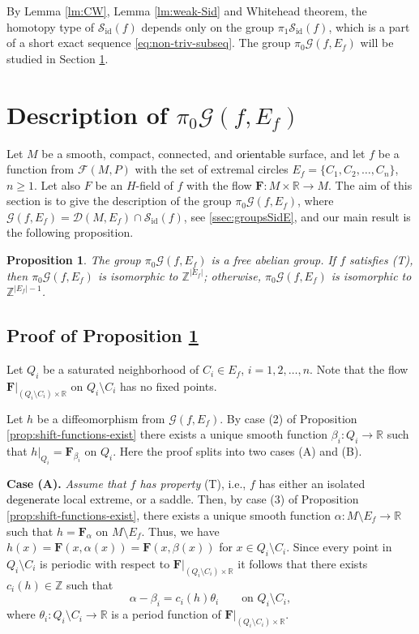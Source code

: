 \documentclass[10pt,reqno]{amsart}
\newtheorem{proposition}[subsection]{Proposition}
\newcommand{\bbR}{\mathbb{R}}
\newcommand{\bbZ}{\mathbb{Z}}
\newcommand{\bfF}{\mathbf{F}}
\newcommand{\Sid}{\mathcal{S}_{\id}(f)}
\newcommand{\F}{\mathcal{F}(M,P)}
\newcommand{\id}{\mathrm{id}}
\newcommand{\textr}[1]{\textcolor{black}{#1}}
\begin{document}
By Lemma \ref{lm:CW}, Lemma \ref{lm:weak-Sid} and Whitehead theorem, the homotopy type of $\mathcal{S}_{\id}(f)$ depends only on the group  $\pi_1\mathcal{S}_{\id}(f)$, which is a part of  a short exact sequence \eqref{eq:non-triv-subseq}. The group $\pi_0\mathcal{G}(f, E_f)$ will be studied in Section \ref{sec:pi0G}.



\section{Description of $\pi_0\mathcal{G}(f,E_f)$}\label{sec:pi0G}
Let $M$ be a smooth, compact, connected, and \textr{orientable} surface, and let $f$ be a function from $\F$ with the set of extremal circles $E_f = \{C_1,C_2,\ldots, C_n\}$, $n\geq 1$. Let also $F$ be an $H$-field of $f$ with the flow $\bfF:M\times\bbR\to M$. The aim of this section is to give the description of the group $\pi_0\mathcal{G}(f, E_f)$, where $\mathcal{G}(f,E_f) = \mathcal{D}(M, E_f)\cap \Sid$, see \textsection\ref{ssec:groupsSidE}, and
our main result   is the following proposition.
\begin{proposition}\label{prop:pi0-G}
	The group $\pi_0\mathcal{G}(f, E_f)$ is a free abelian group. If
	$f$ satisfies {\rm (T)},  then $\pi_0\mathcal{G}(f, E_f)$ is isomorphic to $\bbZ^{|E_f|}$; otherwise, $\pi_0\mathcal{G}(f, E_f)$ is isomorphic to $\bbZ^{|E_f|-1}$.
\end{proposition}




\subsection{Proof of Proposition \ref{prop:pi0-G}}
 Let $Q_i$ be a saturated neighborhood of $C_i\in E_f$, $i = 1,2,\ldots, n$.  Note that the flow $\bfF|_{(Q_i\setminus C_i)\times\bbR}$ on $Q_i\setminus C_i$ has no fixed points.



Let $h$ be a diffeomorphism from $\mathcal{G}(f, E_f).$ 
By case (2) of Proposition \ref{prop:shift-functions-exist} there exists a unique smooth function $\beta_i:Q_i\to \bbR$ such that $h|_{Q_i} = \bfF_{\beta_i}$ on $Q_i$. 
Here the proof splits into two cases (A) and (B).

{\bf Case (A).} {\it Assume that $f$ has property} (T), i.e., $f$ has  either an isolated \textr{degenerate} local extreme, or a saddle. Then,  by case (3) of  Proposition \ref{prop:shift-functions-exist},  there exists a unique smooth function $\alpha:M\setminus E_f\to \bbR$ such that $h = \bfF_{\alpha}$ on $M\setminus E_f.$ Thus,  we have $h(x) = \bfF(x,\alpha(x)) = \bfF(x,\beta(x))$ for  $x\in Q_i\setminus C_i$. Since every point in $Q_i\setminus C_i$ is periodic with respect to $\bfF|_{(Q_i\setminus C_i)\times\bbR}$ it follows that there exists $c_i(h)\in\bbZ$ such that 
\begin{equation}\label{eq:c_i(h)-non-per}
\alpha-\beta_i = c_i(h)\theta_i\qquad \text{on }Q_i\setminus C_i,
\end{equation}
where $\theta_i:Q_i\setminus C_i\to \bbR$ is a period function of $\bfF|_{(Q_i\setminus C_i)\times\bbR}$.
\end{document}
